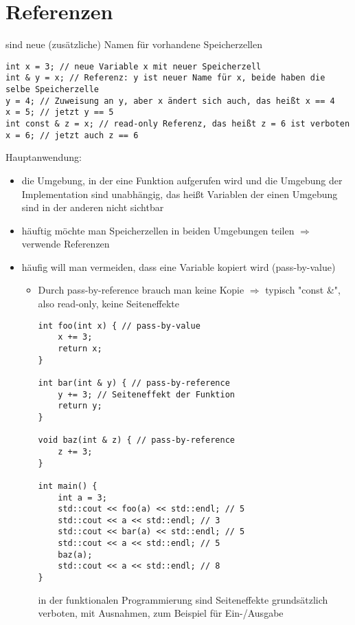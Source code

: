 \documentclass[a4paper]{scrartcl}
\begin{document}
\section{Referenzen}
\label{sec-12}
sind neue (zusätzliche) Namen für vorhandene Speicherzellen
\begin{verbatim}
int x = 3; // neue Variable x mit neuer Speicherzell
int & y = x; // Referenz: y ist neuer Name für x, beide haben die selbe Speicherzelle
y = 4; // Zuweisung an y, aber x ändert sich auch, das heißt x == 4
x = 5; // jetzt y == 5
int const & z = x; // read-only Referenz, das heißt z = 6 ist verboten
x = 6; // jetzt auch z == 6
\end{verbatim}
Hauptanwendung:
\begin{itemize}
\item die Umgebung, in der eine Funktion aufgerufen wird und die Umgebung der Implementation sind unabhängig, das heißt Variablen der einen Umgebung sind in der anderen nicht sichtbar
\item häuftig möchte man Speicherzellen in beiden Umgebungen teilen $\Rightarrow$ verwende Referenzen
\item häufig will man vermeiden, dass eine Variable kopiert wird (pass-by-value)
\begin{itemize}
\item Durch pass-by-reference brauch man keine Kopie $\Rightarrow$ typisch "const \&", also read-only, keine Seiteneffekte
\begin{verbatim}
int foo(int x) { // pass-by-value
	x += 3;
	return x;
}

int bar(int & y) { // pass-by-reference
	y += 3; // Seiteneffekt der Funktion
	return y;
}

void baz(int & z) { // pass-by-reference
	z += 3;
}

int main() {
	int a = 3;
	std::cout << foo(a) << std::endl; // 5
	std::cout << a << std::endl; // 3
	std::cout << bar(a) << std::endl; // 5
	std::cout << a << std::endl; // 5
	baz(a);
	std::cout << a << std::endl; // 8
}
\end{verbatim}
in der funktionalen Programmierung sind Seiteneffekte grundsätzlich verboten, 
mit Ausnahmen, zum Beispiel für Ein-/Ausgabe
\end{itemize}
\end{itemize}
\end{document}
